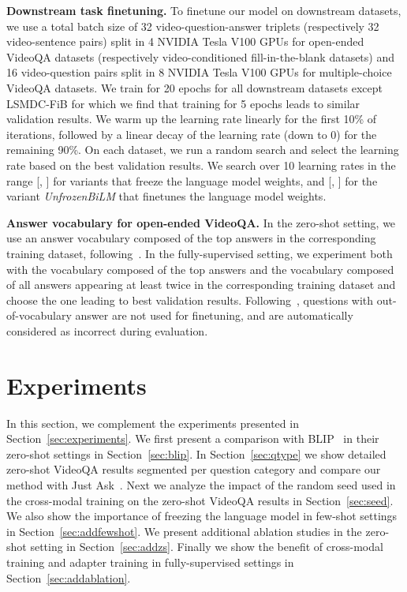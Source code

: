 \noindent \textbf{Downstream task finetuning.}
To finetune our model on downstream datasets, we use a total batch size of 32 video-question-answer triplets (respectively 32 video-sentence pairs) split in 4 NVIDIA Tesla V100 GPUs for open-ended VideoQA datasets (respectively video-conditioned fill-in-the-blank datasets) and 16 video-question pairs split in 8 NVIDIA Tesla V100 GPUs for multiple-choice VideoQA datasets.
We train for 20 epochs for all downstream datasets except LSMDC-FiB for which we find that training for 5 epochs leads to similar validation results.
We warm up the learning rate linearly for the first 10\% of iterations, followed by a linear decay of the learning rate (down to 0) for the remaining 90\%. 
On each dataset, we run a random search and select the learning rate based on the best validation results.
We search over 10 learning rates in the range [, ] for variants that freeze the language model weights, and [, ] for the variant \textit{UnfrozenBiLM} that finetunes the language model weights.

\noindent \textbf{Answer vocabulary for open-ended VideoQA.}
In the zero-shot setting, we use an answer vocabulary composed of the top  answers in the corresponding training dataset, following~\cite{zellers2021merlot}. 
In the fully-supervised setting, we experiment both with the vocabulary composed of the top  answers and the vocabulary composed of all answers appearing at least twice in the corresponding training dataset and choose the one leading to best validation results.
Following~\cite{zellers2021merlot}, questions with out-of-vocabulary answer are not used for finetuning, and are automatically considered as incorrect during evaluation.

\section{Experiments}\label{sec:addexperiments}

In this section, we complement the experiments presented in Section~\ref{sec:experiments}.
We first present a comparison with BLIP~\cite{li2022blip} in their zero-shot settings in Section~\ref{sec:blip}.
In Section~\ref{sec:qtype} we show detailed zero-shot VideoQA results segmented per question category and compare our method with Just Ask~\cite{yang2021just}.
Next we analyze the impact of the random seed used in the cross-modal training on the zero-shot VideoQA results in Section~\ref{sec:seed}.
We also show the importance of freezing the language model in few-shot settings in Section~\ref{sec:addfewshot}.
We present additional ablation studies in the zero-shot setting in Section~\ref{sec:addzs}.
Finally we show the benefit of cross-modal training and adapter training in fully-supervised settings in Section~\ref{sec:addablation}.

